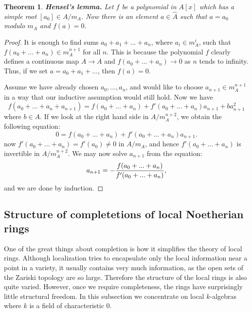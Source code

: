 \documentclass[12pt,a4paper,leqno]{article}
\theoremstyle{plain}
\newtheorem{thm}[theo]{Theorem}
\theoremstyle{definition}
\theoremstyle{remark}
\begin{document}
\begin{thm} \textbf{Hensel's lemma.} Let $f$ be a polynomial in $A[x]$ which has a simple root $[a_0] \in A/m_A$. Now there is an element $a \in \widehat A$ such that $a = a_0$ modulo $m_A$ and $f(a) = 0$.
\end{thm} 
\begin{proof}
It is enough to find sums $a_0 + a_1 + ... + a_n$, where $a_i \in m_A^i$, such that $f(a_0 + ... + a_n) \in m_A^{n+1}$ for all $n$. This is because the polynomial $f$ clearly defines a continuous map $A \to A$ and $f(a_0 + ... + a_n) \to 0$ as $n$ tends to infinity. Thus, if we set $a = a_0 + a_1 + ...$, then $f(a) = 0$.
 
Assume we have already chosen $a_0,...,a_n$, and would like to choose $a_{n+1} \in m_A^{n+1}$ in a way that our inductive assumption would still hold. Now we have
\begin{equation*}
f(a_0 + ... + a_n + a_{n+1}) = f(a_0 + ... + a_n) + f'(a_0 + ... + a_n)a_{n+1} + b a_{n+1}^2
\end{equation*}
where $b \in A$. If we look at the right hand side in $A/m_A^{n+2}$, we obtain the following equation:
\begin{equation*}
0 = f(a_0 + ... + a_n) + f'(a_0 + ... + a_n)a_{n+1}.
\end{equation*}
now $f'(a_0 + ... + a_n) = f'(a_0) \not = 0$ in $A/m_A$, and hence $f'(a_0 + ... + a_n)$ is invertible in $A/m_A^{n+2}$. We may now solve $a_{n+1}$ from the equation:
\begin{equation*}
a_{n+1} = - {f(a_0 + ... + a_n) \over f'(a_0 + ... + a_n)},
\end{equation*}
and we are done by induction.
\end{proof}

\subsection{Structure of completetions of local Noetherian rings}

One of the great things about completion is how it simplifies the theory of local rings. Although localization tries to encapsulate only the local information near a point in a variety, it usually contains very much information, as the open sets of the Zariski topology are so large. Therefore the structure of the local rings is also quite varied. However, once we require completeness, the rings have surprisingly little structural freedom. In this subsection we concentrate on local $k$-algebras where $k$ is a field of characteristic 0.
\end{document}
